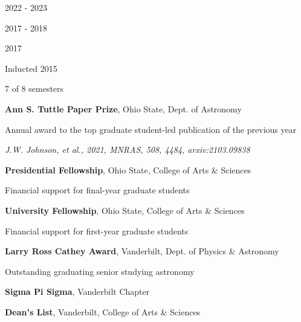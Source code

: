 \documentclass[cv.tex]{subfiles}
\begin{document}
\parbox{0.18\textwidth}{%
	 \par
	\null \par
	\null \par
	2022 - 2023 \par
	\null \par
	2017 - 2018 \par
	\null \par
	2017 \par
	\null \par
	Inducted 2015 \par
	7 of 8 semesters
}
\hspace{1mm}
\parbox{0.8\textwidth}{%
	\vspace{1mm}
	\textbf{Ann S. Tuttle Paper Prize}, Ohio State, Dept. of Astronomy \par
	Annual award to the top graduate student-led publication of the previous
	year \par
	\textit{J.W. Johnson, et al., 2021, MNRAS, 508, 4484, arxiv:2103.09838} \par
	\textbf{Presidential Fellowship}, Ohio State, College of Arts \& Sciences
	\par
	Financial support for final-year graduate students \par
	\textbf{University Fellowship}, Ohio State, College of Arts \& Sciences \par
	Financial support for first-year graduate students \par
	\textbf{Larry Ross Cathey Award}, Vanderbilt, Dept. of Physics \& Astronomy
	\par
	Outstanding graduating senior studying astronomy \par
	\textbf{Sigma Pi Sigma}, Vanderbilt Chapter
	\par
	\textbf{Dean's List}, Vanderbilt, College of Arts \& Sciences
}
\end{document}
